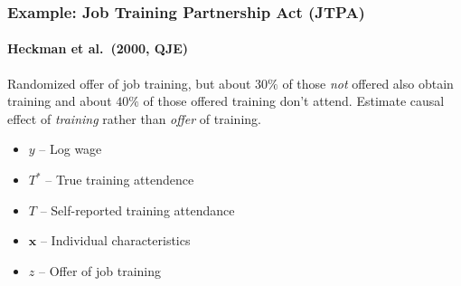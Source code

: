 \documentclass{beamer}
\begin{document}
\begin{frame}
  \frametitle{Example: Job Training Partnership Act (JTPA)}
\framesubtitle{Heckman et al.\ (2000, QJE)}
Randomized offer of job training, but about $30\%$ of those \emph{not} offered also obtain training and about $40\%$ of those offered training don't attend. Estimate causal effect of \emph{training} rather than \emph{offer} of training.

\begin{itemize}
  \item $y$ -- Log wage 
  \item $T^*$ -- True training attendence
  \item $T$ -- Self-reported training attendance
  \item $\mathbf{x}$ -- Individual characteristics
  \item $z$ -- Offer of job training
\end{itemize}
   
\end{frame}
%
\end{document}
